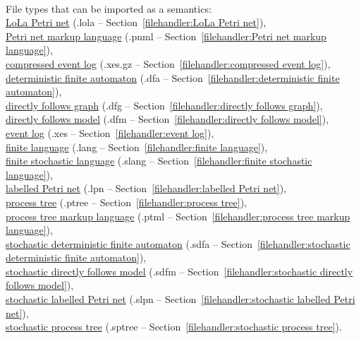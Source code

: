 {\begin{itemize}
\\File types that can be imported as a semantics: \\\null\qquad\hyperref[filehandler:LoLa Petri net]{LoLa Petri net} (.lola -- Section~\ref{filehandler:LoLa Petri net}), \\\null\qquad\hyperref[filehandler:Petri net markup language]{Petri net markup language} (.pnml -- Section~\ref{filehandler:Petri net markup language}), \\\null\qquad\hyperref[filehandler:compressed event log]{compressed event log} (.xes.gz -- Section~\ref{filehandler:compressed event log}), \\\null\qquad\hyperref[filehandler:deterministic finite automaton]{deterministic finite automaton} (.dfa -- Section~\ref{filehandler:deterministic finite automaton}), \\\null\qquad\hyperref[filehandler:directly follows graph]{directly follows graph} (.dfg -- Section~\ref{filehandler:directly follows graph}), \\\null\qquad\hyperref[filehandler:directly follows model]{directly follows model} (.dfm -- Section~\ref{filehandler:directly follows model}), \\\null\qquad\hyperref[filehandler:event log]{event log} (.xes -- Section~\ref{filehandler:event log}), \\\null\qquad\hyperref[filehandler:finite language]{finite language} (.lang -- Section~\ref{filehandler:finite language}), \\\null\qquad\hyperref[filehandler:finite stochastic language]{finite stochastic language} (.slang -- Section~\ref{filehandler:finite stochastic language}), \\\null\qquad\hyperref[filehandler:labelled Petri net]{labelled Petri net} (.lpn -- Section~\ref{filehandler:labelled Petri net}), \\\null\qquad\hyperref[filehandler:process tree]{process tree} (.ptree -- Section~\ref{filehandler:process tree}), \\\null\qquad\hyperref[filehandler:process tree markup language]{process tree markup language} (.ptml -- Section~\ref{filehandler:process tree markup language}), \\\null\qquad\hyperref[filehandler:stochastic deterministic finite automaton]{stochastic deterministic finite automaton} (.sdfa -- Section~\ref{filehandler:stochastic deterministic finite automaton}), \\\null\qquad\hyperref[filehandler:stochastic directly follows model]{stochastic directly follows model} (.sdfm -- Section~\ref{filehandler:stochastic directly follows model}), \\\null\qquad\hyperref[filehandler:stochastic labelled Petri net]{stochastic labelled Petri net} (.slpn -- Section~\ref{filehandler:stochastic labelled Petri net}), \\\null\qquad\hyperref[filehandler:stochastic process tree]{stochastic process tree} (.sptree -- Section~\ref{filehandler:stochastic process tree}).

\end{itemize}}
